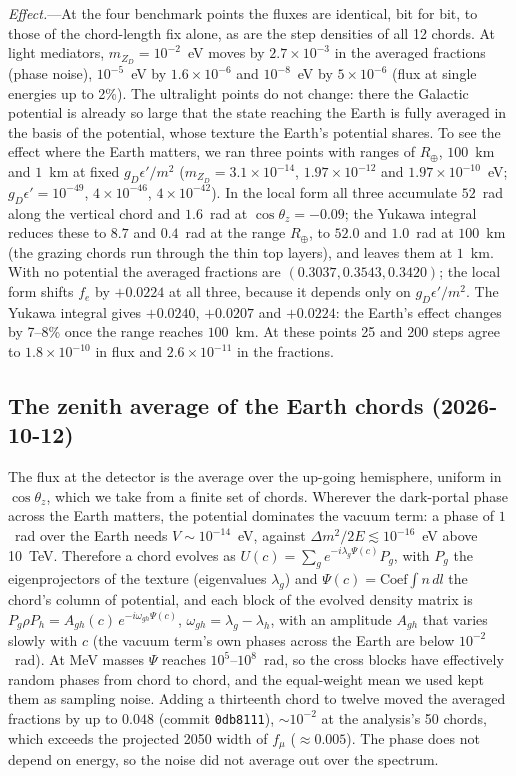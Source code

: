 \documentclass[11pt,a4paper]{article}
\newcommand{\mzd}{m_{Z_D}}
\newcommand{\gd}{g_D}
\newcommand{\epsp}{\epsilon'}
\begin{document}
\textit{Effect.}---At the four benchmark points the fluxes are identical, bit for bit, to those of
the chord-length fix alone, as are the step densities of all 12 chords. At light mediators,
$\mzd = 10^{-2}$~eV moves by $2.7\times10^{-3}$ in the averaged fractions (phase noise),
$10^{-5}$~eV by $1.6\times10^{-6}$ and $10^{-8}$~eV by $5\times10^{-6}$ (flux at single energies
up to 2\%). The ultralight points do not change: there the Galactic potential is already so
large that the state reaching the Earth is fully averaged in the basis of the potential, whose
texture the Earth's potential shares. To see the effect where the Earth matters, we ran three
points with ranges of $R_\oplus$, $100$~km and $1$~km at fixed $\gd\epsp/m^2$ ($\mzd = 3.1\times10^{-14}$, $1.97\times10^{-12}$ and
$1.97\times10^{-10}$~eV; $\gd\epsp = 10^{-49}$, $4\times10^{-46}$, $4\times10^{-42}$). In the
local form all three accumulate $52$~rad along the vertical chord and $1.6$~rad at
$\cos\theta_z = -0.09$; the Yukawa integral reduces these to $8.7$ and $0.4$~rad at the range
$R_\oplus$, to $52.0$ and $1.0$~rad at $100$~km (the grazing chords run through the thin top
layers), and leaves them at $1$~km. With no
potential the averaged fractions are $(0.3037, 0.3543, 0.3420)$; the local form shifts $f_e$ by
$+0.0224$ at all three, because it depends only on $\gd\epsp/m^2$. The Yukawa integral gives
$+0.0240$, $+0.0207$ and $+0.0224$: the Earth's effect changes by 7--8\% once the range reaches
$100$~km. At these points 25 and 200 steps agree to $1.8\times10^{-10}$ in flux and
$2.6\times10^{-11}$ in the fractions.

\subsection{The zenith average of the Earth chords (2026-10-12)}
\label{app:zenith}

The flux at the detector is the average over the up-going hemisphere, uniform in $\cos\theta_z$,
which we take from a finite set of chords. Wherever the dark-portal phase across the Earth matters,
the potential dominates the vacuum term: a phase of $1$~rad over the Earth needs
$V\sim10^{-14}$~eV, against $\Delta m^2/2E \lesssim 10^{-16}$~eV above 10~TeV. Therefore a chord
evolves as $U(c) = \sum_g e^{-i\lambda_g\Psi(c)}P_g$, with $P_g$ the eigenprojectors of the
texture (eigenvalues $\lambda_g$) and $\Psi(c) = \mathrm{Coef}\int n\,dl$ the chord's column of
potential, and each block of the evolved density matrix is
$P_g\rho P_h = A_{gh}(c)\,e^{-i\omega_{gh}\Psi(c)}$, $\omega_{gh} = \lambda_g-\lambda_h$, with an
amplitude $A_{gh}$ that varies slowly with $c$ (the vacuum term's own phases across the Earth are
below $10^{-2}$~rad). At MeV masses $\Psi$ reaches $10^5$--$10^8$~rad, so the cross blocks have
effectively random phases from chord to chord, and the equal-weight mean we used kept them as
sampling noise. Adding a thirteenth chord to twelve moved the averaged fractions by up to $0.048$
(commit \texttt{0db8111}), $\sim10^{-2}$ at the analysis's 50 chords, which exceeds the projected
2050 width of $f_\mu$ ($\approx0.005$). The phase does not depend on energy, so the noise did not
average out over the spectrum.
\end{document}

